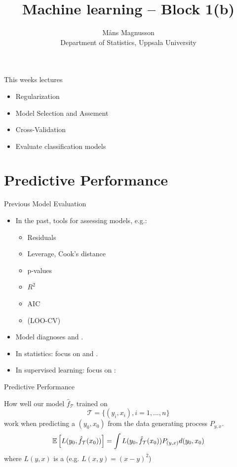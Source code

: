\documentclass[10pt]{beamer}
\title[]{{\color{black}Machine learning -- Block 1(b)}}
\author[]{M{\aa}ns Magnusson\\Department of Statistics, Uppsala University}
\date{\currentsemester}
\begin{document}
\frame{\titlepage
}



\begin{frame}{This weeks lectures}
\begin{itemize}
\item Regularization
\item Model Selection and Assement
\item Cross-Validation
\item Evaluate classification models
\end{itemize}
\end{frame}




\section{Predictive Performance}
\frame{\sectionpage}

\begin{frame}{Previous Model Evaluation}
\begin{itemize}
\item In the past, tools for assessing models, e.g.:
\begin{itemize}
\item Residuals
\item Leverage, Cook's distance
\item p-values
\item $R^2$
\item AIC
\item (LOO-CV)
\end{itemize}
\item Model diagnoses and .
\pause
\item In statistics: focus on  and .
\item In supervised learning: focus on :
\end{itemize}
\end{frame}


\begin{frame}{Predictive Performance}



How well our model $\hat{f}_\mathcal{T}$ trained on
\[
\mathcal{T}=\{(y_i, x_i), i = 1, ..., n\}
\]
work when predicting a  $(y_0,x_0)$ from the data generating process $P_{y,x}$.
\[
\operatorname{\mathbb{E}}\left[L(y_0,\hat{f}_\mathcal{T}(x_0))\right] = \int L(y_0, \hat{f}_\mathcal{T}(x_0)) P_{(y,x)} d(y_0,x_0)
\]
where $L(y,x)$ is a  (e.g. $L(x,y) = (x-y)^2$)

\end{frame}
\end{document}
